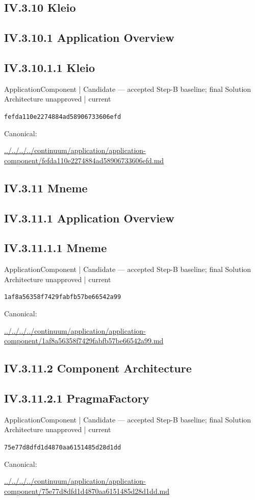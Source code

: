 \documentclass[10pt,a4paper]{article}
\begin{document}
\subsection*{IV.3.10 Kleio}
\subsection*{IV.3.10.1 Application Overview}
\subsection*{IV.3.10.1.1 Kleio}
\label{element-fefda110e2274884ad58906733606efd}
{\small ApplicationComponent | Candidate — accepted Step-B baseline; final Solution Architecture unapproved | current}\par
\texttt{fefda110e2274884ad58906733606efd}\par
Canonical: \par
{\footnotesize\url{../../../../continuum/application/application-component/fefda110e2274884ad58906733606efd.md}}\par
\subsection*{IV.3.11 Mneme}
\subsection*{IV.3.11.1 Application Overview}
\subsection*{IV.3.11.1.1 Mneme}
\label{element-1af8a56358f7429fabfb57be66542a99}
{\small ApplicationComponent | Candidate — accepted Step-B baseline; final Solution Architecture unapproved | current}\par
\texttt{1af8a56358f7429fabfb57be66542a99}\par
Canonical: \par
{\footnotesize\url{../../../../continuum/application/application-component/1af8a56358f7429fabfb57be66542a99.md}}\par
\subsection*{IV.3.11.2 Component Architecture}
\subsection*{IV.3.11.2.1 PragmaFactory}
\label{element-75e77d8dfd1d4870aa6151485d28d1dd}
{\small ApplicationComponent | Candidate — accepted Step-B baseline; final Solution Architecture unapproved | current}\par
\texttt{75e77d8dfd1d4870aa6151485d28d1dd}\par
Canonical: \par
{\footnotesize\url{../../../../continuum/application/application-component/75e77d8dfd1d4870aa6151485d28d1dd.md}}\par
\end{document}
